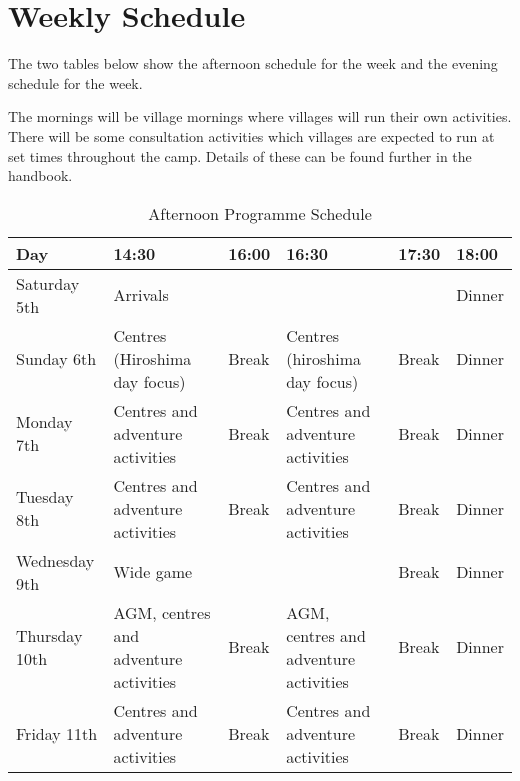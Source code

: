 \documentclass[a4paper, 11pt]{report}
\begin{document}
\section{Weekly Schedule}
The two tables below show the afternoon schedule for the week and the evening schedule for the week.\nl

The mornings will be village mornings where villages will run their own activities. There will be some consultation activities which villages are expected to run at set times throughout the camp. Details of these can be found further in the handbook. 
\begin{table}[H]
    \centering
    {\RaggedRight
    \begin{tabular}{p{} p{} p{} p{} p{} p{}}
        \textbf{Day} & \textbf{14:30} & \textbf{16:00} & \textbf{16:30} & \textbf{17:30} & \textbf{18:00} \\
        \hline
        Saturday 5th & \multicolumn{4}{l}{Arrivals} & Dinner \\
        \hline
        Sunday 6th & Centres (Hiroshima day focus) & Break & Centres (hiroshima day focus) & Break & Dinner \\
        \hline
        Monday 7th & Centres and adventure activities & Break & Centres and adventure activities & Break & Dinner \\
        \hline
        Tuesday 8th & Centres and adventure activities & Break & Centres and adventure activities & Break & Dinner \\
        \hline
        Wednesday 9th & \multicolumn{3}{l}{Wide game} & Break & Dinner \\
        \hline
        Thursday 10th & AGM, centres and adventure activities & Break & AGM, centres and adventure activities & Break & Dinner \\
        \hline 
        Friday 11th & Centres and adventure activities & Break & Centres and adventure activities & Break & Dinner\\
        \hline
    \end{tabular}
    }%
    \caption{Afternoon Programme Schedule}
\end{table}
\end{document}
